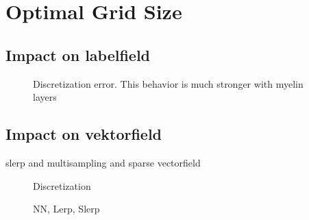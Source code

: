 % 
\section{Optimal Grid Size}

\subsection{Impact on labelfield}
% 
\tikzexternaldisable
% 
\begin{figure}[!tb]
\centering
{}
\caption[Discretization error]{Discretization error. This behavior is much stronger with myelin layers}
\label{fig:vectorfield_disc_error}
\end{figure}
% 
\tikzexternalenable
% 
\subsection{Impact on vektorfield}
% 
slerp and multisampling and sparse vectorfield
% 
\begin{figure}[!tb]
\centering
{}
\caption{Discretization}
\end{figure}

\begin{figure}[!tb]
\centering
{}
\caption{NN, Lerp, Slerp}
\end{figure}
% 
% 

